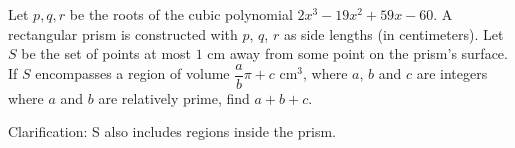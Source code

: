 Let $p, q, r$ be the roots of the cubic polynomial $2x^3-19x^2+59x-60$. A rectangular prism is constructed with $p$, $q$, $r$ as side lengths (in centimeters). Let $S$ be the set of points at most $1$ cm away from some point on the prism's surface. If $S$ encompasses a region of volume $\dfrac{a}{b} \pi + c$ cm$^3$, where $a$, $b$ and $c$ are integers where $a$ and $b$ are relatively prime, find $a + b + c$.



Clarification: S also includes regions inside the prism.
